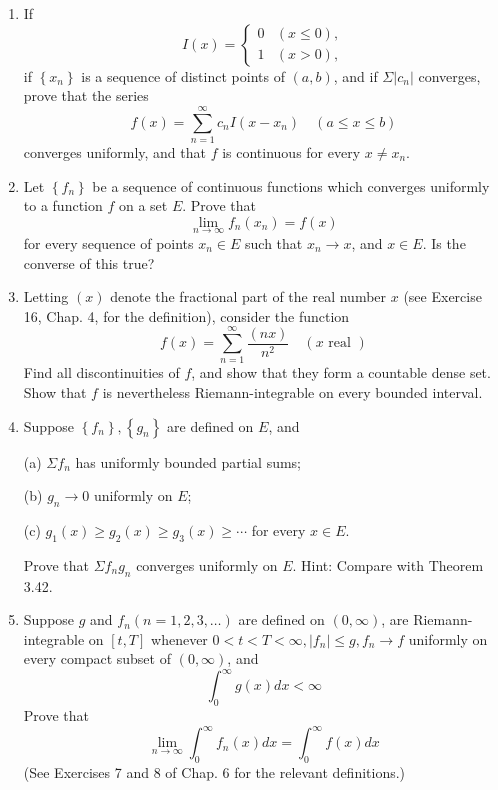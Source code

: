 \documentclass[10pt]{article}
\begin{document}
\begin{enumerate}
  \item If
  $$
  I(x)= \begin{cases}0 & (x \leq 0), \\ 1 & (x>0),\end{cases}
  $$
  if $\left\{x_{n}\right\}$ is a sequence of distinct points of $(a, b)$, and if $\Sigma\left|c_{n}\right|$ converges, prove that the series
  $$
  f(x)=\sum_{n=1}^{\infty} c_{n} I\left(x-x_{n}\right) \quad(a \leq x \leq b)
  $$
  converges uniformly, and that $f$ is continuous for every $x \neq x_{n}$.

  \item Let $\left\{f_{n}\right\}$ be a sequence of continuous functions which converges uniformly to a function $f$ on a set $E$. Prove that
  $$
  \lim _{n \rightarrow \infty} f_{n}\left(x_{n}\right)=f(x)
  $$
  for every sequence of points $x_{n} \in E$ such that $x_{n} \rightarrow x$, and $x \in E$. Is the converse of this true?

  \item Letting $(x)$ denote the fractional part of the real number $x$ (see Exercise 16, Chap. 4, for the definition), consider the function
  $$
  f(x)=\sum_{n=1}^{\infty} \frac{(n x)}{n^{2}} \quad(x \text { real })
  $$
  Find all discontinuities of $f$, and show that they form a countable dense set. Show that $f$ is nevertheless Riemann-integrable on every bounded interval.

  \item Suppose $\left\{f_{n}\right\},\left\{g_{n}\right\}$ are defined on $E$, and

  (a) $\Sigma f_{n}$ has uniformly bounded partial sums;

  (b) $g_{n} \rightarrow 0$ uniformly on $E$;

  (c) $g_{1}(x) \geq g_{2}(x) \geq g_{3}(x) \geq \cdots$ for every $x \in E$.

  Prove that $\Sigma f_{n} g_{n}$ converges uniformly on $E$. Hint: Compare with Theorem 3.42.

  \item Suppose $g$ and $f_{n}(n=1,2,3, \ldots)$ are defined on $(0, \infty)$, are Riemann-integrable on $[t, T]$ whenever $0<t<T<\infty,\left|f_{n}\right| \leq g, f_{n} \rightarrow f$ uniformly on every compact subset of $(0, \infty)$, and
  $$
  \int_{0}^{\infty} g(x) d x<\infty
  $$
  Prove that
  $$
  \lim _{n \rightarrow \infty} \int_{0}^{\infty} f_{n}(x) d x=\int_{0}^{\infty} f(x) d x
  $$
  (See Exercises 7 and 8 of Chap. 6 for the relevant definitions.)


\end{enumerate}
\end{document}
